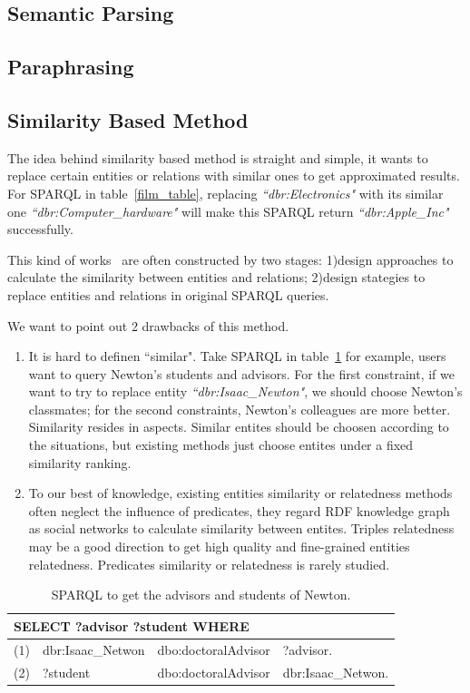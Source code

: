 \documentclass[runningheads]{llncs}
\begin{document}
\subsection{Semantic Parsing}
\subsection{Paraphrasing}
\subsection{Similarity Based Method}
The idea behind similarity based method is straight and simple, it wants to replace certain entities or relations with similar ones to get approximated results. For SPARQL in table~\ref{film_table}, replacing \textit{``dbr:Electronics"} with its similar one \textit{``dbr:Computer\_hardware"} will make this SPARQL return \textit{``dbr:Apple\_Inc"} successfully.

This kind of works~\cite{elbassuoni2011query} are often constructed by two stages: 1)design approaches to calculate the similarity between entities and relations; 2)design stategies to replace entities and relations in original SPARQL queries.

We want to point out 2 drawbacks of this method.
\begin{enumerate}
  \item It is hard to definen ``similar". Take SPARQL in table~\ref{Netwon_s_t} for example, users want to query Newton's students and advisors. For the first constraint, if we want to try to replace entity \textit{``dbr:Isaac\_Newton"}, we should choose Newton's classmates; for the second constraints, Newton's colleagues are more better. Similarity resides in aspects. Similar entites should be choosen according to the situations, but existing methods just choose entites under a fixed similarity ranking.
  \item To our best of knowledge, existing entities similarity or relatedness methods~\cite{ponza2017two,2014deepwalk} often neglect the influence of predicates, they regard RDF knowledge graph as social networks to calculate similarity between entites. Triples relatedness~\cite{2018weakly} may be a good direction to get high quality and fine-grained entities relatedness. Predicates similarity or relatedness is rarely studied.
\end{enumerate}

\begin{table}
\caption{SPARQL to get the advisors and students of Newton.}\label{Netwon_s_t}
\centering
\begin{tabular}{|c|lll|}
\hline
\multicolumn{4}{|l|}{SELECT ?advisor ?student WHERE }\\
\hline
(1) &  dbr:Isaac\_Netwon & dbo:doctoralAdvisor & ?advisor.\\
(2) & ?student & dbo:doctoralAdvisor & dbr:Isaac\_Netwon.\\
\hline
\end{tabular}
\end{table}
\end{document}
